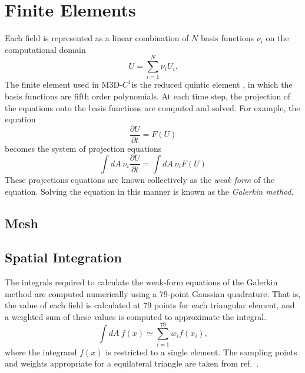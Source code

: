 \documentclass[draft]{book}
\newcommand{\ddt}[1]{\frac{\partial #1}{\partial t}}
\newcommand{\codename}{M3D-$C^1$}
\begin{document}
\section{Finite Elements}

Each field is represented as a linear combination of $N$ basis
functions $\nu_i$ on the computational domain
\[ U = \sum_{i=1}^N \nu_i U_i. \]
The finite element used in \codename is the reduced quintic element
\cite{Jardin04}, in which the basis functions are fifth order
polynomials.  At each time step, the projection of the equations onto
the basis functions are computed and solved.  For example, the
equation
\[ \ddt{U} = F(U) \]
becomes the system of projection equations
\[ \int dA\ \nu_i \ddt{U} = \int dA\ \nu_i F(U) \]
These projections equations are known collectively as the \emph{weak
form} of the equation.  Solving the equation in this manner is known
as the \emph{Galerkin method}.

\subsection{Mesh}


\subsection{Spatial Integration}

The integrals required to calculate the weak-form equations of the
Galerkin method are computed numerically using a 79-point Gaussian
quadrature.  That is, the value of each field is calculated at 79
points for each triangular element, and a weighted sum of these values
is computed to approximate the integral.
\[
  \int dA\ f(x) \simeq \sum_{i=1}^{79} w_i f(x_i),
\]
where the integrand $f(x)$ is restricted to a single element.  The
sampling points and weights appropriate for a equilateral triangle are
taken from ref.~\cite{Dunavant85}.
\end{document}
